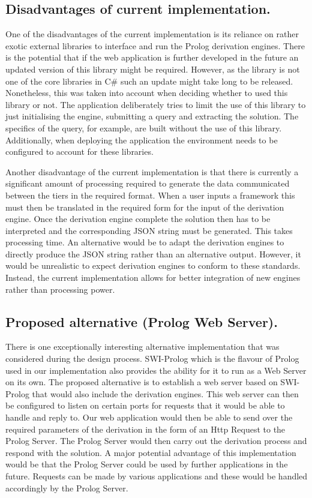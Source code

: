 \subsection{Disadvantages of current implementation.}

One of the disadvantages of the current implementation is its reliance on rather exotic external libraries to interface and run the Prolog derivation engines. There is the potential that if the web application is further developed in the future an updated version of this library might be required. However, as the library is not one of the core libraries in C\# such an update might take long to be released. Nonetheless, this was taken into account when deciding whether to used this library or not. The application deliberately tries to limit the use of this library to just initialising the engine, submitting a query and extracting the solution. The specifics of the query, for example, are built without the use of this library. Additionally, when deploying the application the environment needs to be configured to account for these libraries.

Another disadvantage of the current implementation is that there is currently a significant amount of processing required to generate the data communicated between the tiers in the required format. When a user inputs a framework this must then be translated in the required form for the input of the derivation engine. Once the derivation engine complete the solution then has to be interpreted and the corresponding JSON string must be generated. This takes processing time. An alternative would be to adapt the derivation engines to directly produce the JSON string rather than an alternative output. However, it would be unrealistic to expect derivation engines to conform to these standards. Instead, the current implementation allows for better integration of new engines rather than processing power.

\subsection{Proposed alternative (Prolog Web Server).}

There is one exceptionally interesting alternative implementation that was considered during the design process. SWI-Prolog which is the flavour of Prolog used in our implementation also provides the ability for it to run as a Web Server on its own. The proposed alternative is to establish a web server based on SWI-Prolog that would also include the derivation engines. This web server can then be configured to listen on certain ports for requests that it would be able to handle and reply to. Our web application would then be able to send over the required parameters of the derivation in the form of an Http Request to the Prolog Server. The Prolog Server would then carry out the derivation process and respond with the solution. A major potential advantage of this implementation would be that the Prolog Server could be used by further applications in the future. Requests can be made by various applications and these would be handled accordingly by the Prolog Server.

